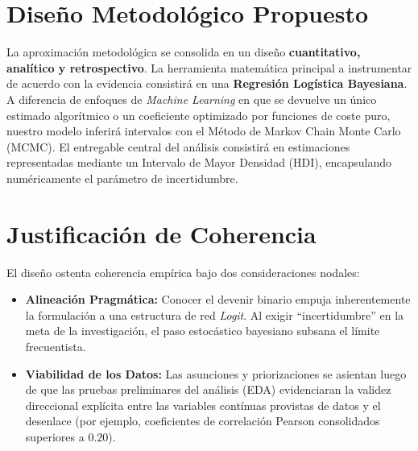 \documentclass[12pt, a4paper]{article}
\begin{document}
\section{Diseño Metodológico Propuesto}
La aproximación metodológica se consolida en un diseño \textbf{cuantitativo, analítico y retrospectivo}. La herramienta matemática principal a instrumentar de acuerdo con la evidencia consistirá en una \textbf{Regresión Logística Bayesiana}. A diferencia de enfoques de \textit{Machine Learning} en que se devuelve un único estimado algorítmico o un coeficiente optimizado por funciones de coste puro, nuestro modelo inferirá intervalos con el Método de Markov Chain Monte Carlo (MCMC). El entregable central del análisis consistirá en estimaciones representadas mediante un Intervalo de Mayor Densidad (HDI), encapsulando numéricamente el parámetro de incertidumbre.

\section{Justificación de Coherencia}
El diseño ostenta coherencia empírica bajo dos consideraciones nodales:
\begin{itemize}
    \item \textbf{Alineación Pragmática:} Conocer el devenir binario empuja inherentemente la formulación a una estructura de red \textit{Logit}. Al exigir ``incertidumbre'' en la meta de la investigación, el paso estocástico bayesiano subsana el límite frecuentista.
    \item \textbf{Viabilidad de los Datos:} Las asunciones y priorizaciones se asientan luego de que las pruebas preliminares del análisis (EDA) evidenciaran la validez direccional explícita entre las variables contínuas provistas de datos y el desenlace (por ejemplo, coeficientes de correlación Pearson consolidados superiores a $0.20$).
\end{itemize}
\end{document}

